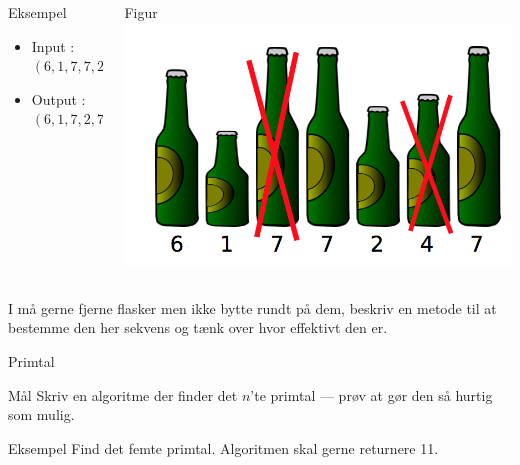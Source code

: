 \documentclass[12pt,t]{beamer}
\begin{document}
\begin{frame}
  \begin{columns}
    \begin{column}{0.5\textwidth}
      \begin{block}{Eksempel}
        \begin{itemize}
          \item Input : $(6, 1, 7, 7, 2, 4, 7)$
          \item Output : $(6,1,7,2,7)$
        \end{itemize}
      \end{block}
    \end{column}
    \begin{column}{0.5\textwidth}
      \begin{block}{Figur}
        \includegraphics[scale=0.3]{include/oel.png}
      \end{block}
    \end{column}
  \end{columns}
  I må gerne fjerne flasker men ikke bytte rundt på dem, beskriv en metode
  til at bestemme den her sekvens og tænk over hvor effektivt den er.
\end{frame}


\begin{frame}{Primtal}
  \begin{block}{Mål}
    Skriv en algoritme der finder det $n$'te primtal --- prøv at gør den så
    hurtig som mulig.
  \end{block}
  \pause

  \begin{exampleblock}{Eksempel}
    Find det femte primtal. Algoritmen skal gerne returnere 11.
  \end{exampleblock}
\end{frame}
\end{document}
